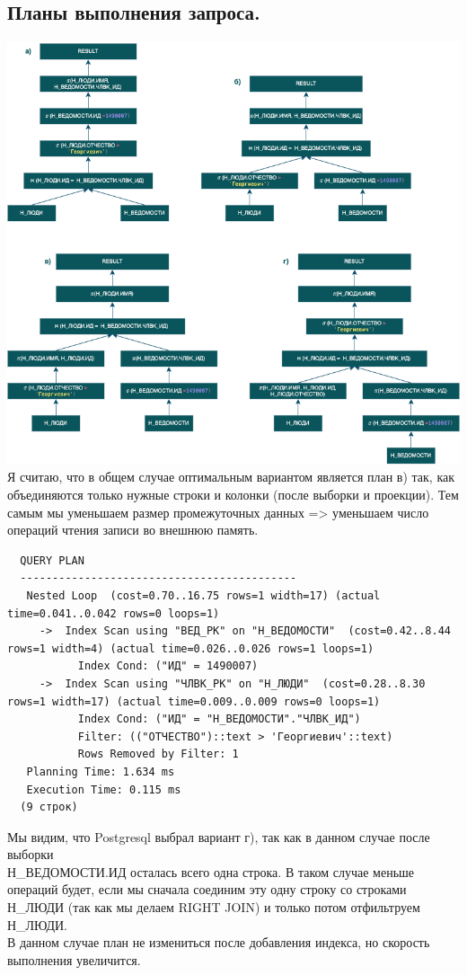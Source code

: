 \documentclass[12pt,onecolumn]{article}
\begin{document}
\subsection{Планы выполнения запроса.}
\includegraphics[width=\textwidth]{./image/plan-1.png}
Я считаю, что в общем случае оптимальным вариантом является план в) так, как объединяются только нужные строки и колонки (после выборки и проекции). 
Тем самым мы уменьшаем размер промежуточных данных => уменьшаем число операций чтения записи во внешнюю память.
\begin{lstlisting}
  QUERY PLAN
  -------------------------------------------
   Nested Loop  (cost=0.70..16.75 rows=1 width=17) (actual time=0.041..0.042 rows=0 loops=1)
     ->  Index Scan using "ВЕД_PK" on "Н_ВЕДОМОСТИ"  (cost=0.42..8.44 rows=1 width=4) (actual time=0.026..0.026 rows=1 loops=1)
           Index Cond: ("ИД" = 1490007)
     ->  Index Scan using "ЧЛВК_PK" on "Н_ЛЮДИ"  (cost=0.28..8.30 rows=1 width=17) (actual time=0.009..0.009 rows=0 loops=1)
           Index Cond: ("ИД" = "Н_ВЕДОМОСТИ"."ЧЛВК_ИД")
           Filter: (("ОТЧЕСТВО")::text > 'Георгиевич'::text)
           Rows Removed by Filter: 1
   Planning Time: 1.634 ms
   Execution Time: 0.115 ms
  (9 строк)
\end{lstlisting}
Мы видим, что Postgresql выбрал вариант г), так как в данном случае после выборки \\
Н\_ВЕДОМОСТИ.ИД осталась всего
одна строка. В таком случае меньше операций будет, если мы сначала соединим эту одну строку со строками Н\_ЛЮДИ (так как мы делаем RIGHT JOIN) и только потом отфильтруем Н\_ЛЮДИ.\\
В данном случае план не измениться после добавления индекса, но скорость выполнения увеличится.
\end{document}
